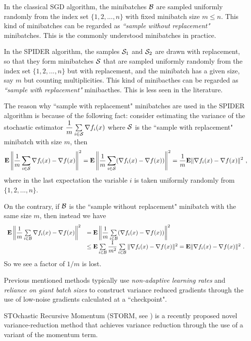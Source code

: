 \begin{remark}\label{Remark:Minibatch}
\rm In the classical SGD algorithm, the minibatches $\mathcal B$ are sampled uniformly randomly from the index set $\{1,2,...,n\}$ with fixed minibatch size $m\leq n$. This kind of minibatches can be regarded as \emph{``sample without replacement"} minibatches. This is the commonly understood minibatches in practice.

In the SPIDER algorithm, the samples $\mathcal S_1$ and $\mathcal S_2$ are drawn with replacement, so that they form minibatches $\mathcal S$ that are sampled uniformly randomly from the index set $\{1,2,...,n\}$ but with replacement, and the minibatch has a given size, say $m$ but counting multiplicities. This kind of minibacthes can be regarded as \emph{``sample with replacement"} minibacthes. This is less seen in the literature.

The reason why ``sample with replacement" minibatches are used in the SPIDER algorithm is because of the following fact: consider estimating the variance of the stochastic estimator $\dfrac{1}{m}\sum\limits_{i\in \mathcal S}\nabla f_i(x)$ where $\mathcal S$ is the ``sample with replacement" minibatch with size $m$, then
$$\mathbf E\left\|\dfrac{1}{m}\sum\limits_{i\in \mathcal S}\nabla f_i(x)-\nabla f(x)\right\|^2=
\mathbf E\left\|\dfrac{1}{m}\sum\limits_{i\in \mathcal S}(\nabla f_i(x)-\nabla f(x))\right\|^2=\dfrac{1}{m}\mathbf E\|\nabla f_i(x)-\nabla f(x)\|^2 \ ,$$
where in the last expectation the variable $i$ is taken uniformly randomly from $\{1,2,...,n\}$.

On the contrary, if $\mathcal B$ is the ``sample without replacement" minibatch with the same size $m$, then instead we have
$$\begin{array}{ll}
\mathbf E\left\|\dfrac{1}{m}\sum\limits_{i\in \mathcal B}\nabla f_i(x)-\nabla f(x)\right\|^2& =
\mathbf E\left\|\dfrac{1}{m}\sum\limits_{i\in \mathcal B}(\nabla f_i(x)-\nabla f(x))\right\|^2 
\\
&\leq
\mathbf E\sum\limits_{i\in \mathcal B}\dfrac{1}{m^2}\sum\limits_{i\in \mathcal B}\|\nabla f_i(x)-\nabla f(x)\|^2 
=\mathbf E\|\nabla f_i(x)- \nabla f(x)\|^2 \ .
\end{array}$$
So we see a factor of $1/m$ is lost.
\end{remark}

Previous mentioned methods typically use \textit{non-adaptive
learning rates} and \textit{reliance on giant batch sizes} to construct variance reduced gradients through the use
of low-noise gradients calculated at a ``checkpoint".

STOchastic Recursive Momentum (STORM, see \cite{STORMpaper}) is a recently proposed novel variance-reduction method that achieves variance reduction through the use of a variant of the momentum term. 

